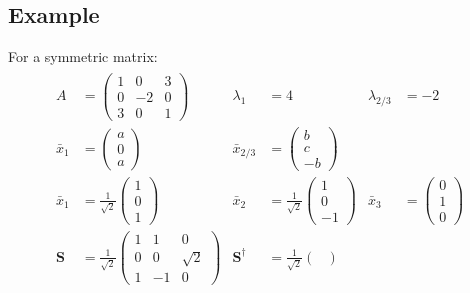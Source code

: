 \documentclass[a4paper, 11pt, normalem]{report}
\begin{document}
\subsection{Example}
For a symmetric matrix:
\begin{gather*}
    \begin{aligned}
        A &=
        \begin{pmatrix}
            1  & 0 & 3 \\
            0 & -2 & 0 \\
            3 &  0 & 1
        \end{pmatrix} & \lambda_1 &= 4 & \lambda_{2/3} &= -2 \\ \bar{x}_1 &=
        \begin{pmatrix}
            a \\
            0 \\
            a
        \end{pmatrix} & \bar{x}_{2/3} &=
        \begin{pmatrix}
            b \\
            c \\
            -b
        \end{pmatrix} \\
        \bar{x}_1 &= \frac{1}{\sqrt{2}}
        \begin{pmatrix}
            1 \\
            0 \\
            1
        \end{pmatrix} & \bar{x}_2 &= \frac{1}{\sqrt{2}}
        \begin{pmatrix}
            1 \\
            0 \\
            -1
        \end{pmatrix} & \bar{x}_3 &=
        \begin{pmatrix}
            0 \\
            1 \\
            0
        \end{pmatrix} \\ \mathbf{S} &= \frac{1}{\sqrt{2}}
        \begin{pmatrix}
            1 & 1 & 0 \\
            0 & 0 & \sqrt{2} \\
            1 & -1 & 0
        \end{pmatrix} & \mathbf{S^{\dagger}} &= \frac{1}{\sqrt{2}}
        \begin{pmatrix}

\end{pmatrix}
\end{aligned}
\end{gather*}
\end{document}

